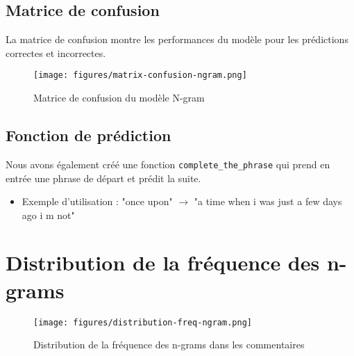 \subsection{Matrice de confusion}

La matrice de confusion montre les performances du modèle pour les prédictions correctes et incorrectes.

\begin{figure}[h]
    \centering
    \texttt{[image: figures/matrix-confusion-ngram.png]}
    \caption{Matrice de confusion du modèle N-gram}
\end{figure}

\subsection{Fonction de prédiction}

Nous avons également créé une fonction \texttt{complete\_the\_phrase} qui prend en entrée une phrase de départ et prédit la suite.

\begin{itemize}
    \item Exemple d'utilisation : "once upon" $\rightarrow$ "a time when i was just a few days ago i m not"
\end{itemize}

\section{Distribution de la fréquence des n-grams}

\begin{figure}[h]
    \centering
    \texttt{[image: figures/distribution-freq-ngram.png]}
    \caption{Distribution de la fréquence des n-grams dans les commentaires}
\end{figure}


